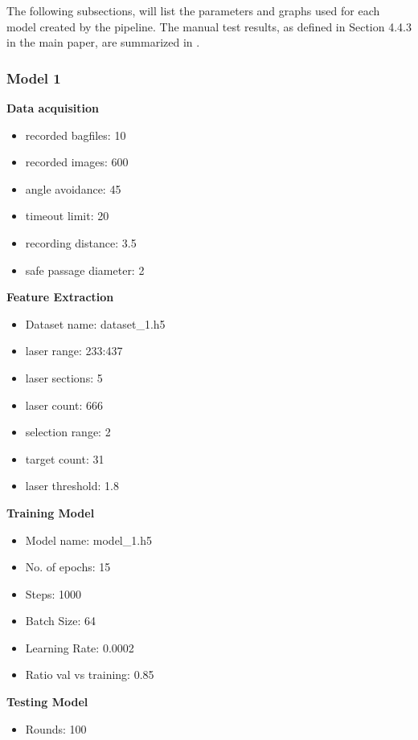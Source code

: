The following subsections, will list the parameters and graphs used for each model created by the pipeline. The manual test results, as defined in Section 4.4.3 in the main paper, are summarized in .

\newpage

\subsubsection{Model 1\label{model_1} }
\begin{multicols}{2}
\textbf{Data acquisition}
\begin{itemize}
\setlength\itemsep{0.1em}
\item recorded bagfiles: 10
\item recorded images: 600
\item angle avoidance: 45
\item timeout limit: 20
\item recording distance: 3.5
\item safe passage diameter: 2
\end{itemize}

\textbf{Feature Extraction}
\begin{itemize}
\setlength\itemsep{0.1em}
\item Dataset name: dataset\_1.h5
\item  laser range: 233:437
\item  laser sections: 5
\item  laser count: 666
\item  selection range: 2
\item  target count: 31
\item  laser threshold: 1.8
\end{itemize}

\columnbreak

\textbf{Training Model}
\begin{itemize}
\setlength\itemsep{0.1em}
\item  Model name: model\_1.h5
\item  No. of epochs: 15
\item  Steps: 1000
\item  Batch Size: 64
\item  Learning Rate: 0.0002
\item  Ratio val vs training: 0.85
\end{itemize}

\textbf{Testing Model}
\begin{itemize}
\setlength\itemsep{0.1em}
\item Rounds: 100
\newline
\newline
\newline
\newline
\newline
\newline
\newline
\newline
\end{itemize}
\end{multicols}


